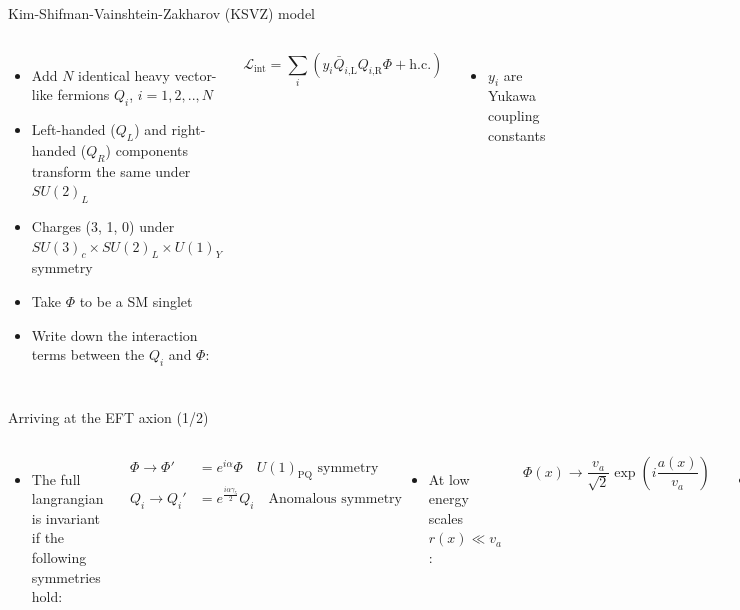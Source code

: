 \documentclass[aspectratio=1610, 9pt]{beamer}
\begin{document}
\begin{frame}{Kim-Shifman-Vainshtein-Zakharov (KSVZ) model}
  \begin{columns}
    \column{\textwidth}
    \begin{itemize}
      \item Add $N$ identical heavy vector-like fermions $Q_i$, $i=1,2,..,N$
      \item Left-handed ($Q_L$) and right-handed ($Q_R$) components transform the same under $SU(2)_L$
      \item Charges (3, 1, 0) under $SU(3)_c × SU(2)_L × U(1)_Y$ symmetry
      \item Take $\Phi$ to be a SM singlet
      \item Write down the interaction terms between the $Q_i$ and $\Phi$:
    \end{itemize}
    \begin{equation*}
      \mathcal{L}_{\text{int}} = \sum_i \left( y_i \bar{Q}_{i \text{,L}} Q_{i \text{,R}} \Phi + \text{h.c.} \right)
    \end{equation*}
    \begin{itemize}
      \item $y_i$ are Yukawa coupling constants
    \end{itemize}
  \end{columns} 
\end{frame}

\begin{frame}{Arriving at the EFT axion (1/2)}
  \begin{columns}
    \column{\textwidth}
    \begin{itemize}
      \item The full langrangian is invariant if the following symmetries hold:
    \end{itemize}
    \begin{align*}
      \Phi \rightarrow \Phi' &= e^{i \alpha} \Phi \quad U(1)_{\text{PQ}} \,\, \text{symmetry} \\
      Q_i \rightarrow Q_i' &= e^{\frac{i \alpha \gamma_5}{2}} Q_i \quad \text{Anomalous symmetry}
    \end{align*}
    \begin{itemize}
      \item At low energy scales $r(x) \ll v_a$:
    \end{itemize}
    \begin{equation*}
      \Phi(x) \rightarrow \frac{v_a}{\sqrt{2}}\exp \left( i\frac{a(x)}{v_a} \right) 
    \end{equation*}
    \begin{itemize}
      \item Substitute into $\mathcal{L}_{\text{int}}$ and define quark masses $m_i = \frac{y_i v_a}{\sqrt{2}}$:
    \end{itemize}
    \begin{equation*}
      \mathcal{L}_{\text{int}} =  \sum_i \left( m_i \bar{Q}_{i \text{,L}} Q_{i \text{,R}} \exp \left( i\frac{a(x)}{v_a} \right) + \text{h.c.} \right)
    \end{equation*}
  \end{columns} 
\end{frame}
\end{document}
